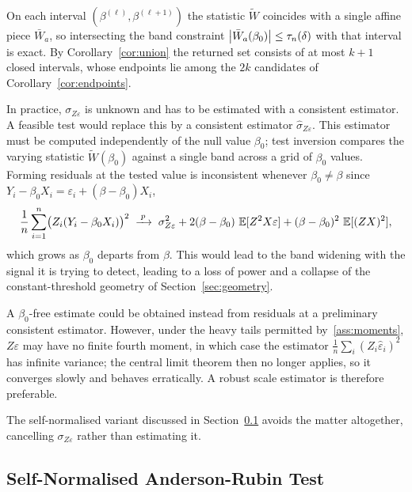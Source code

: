 On each interval $(\beta^{(\ell)},\beta^{(\ell+1)})$ the statistic $\widetilde{W}$ coincides with a single affine piece $\bar{W}_a$, so intersecting the band constraint $\left|\bar{W}_a(\beta_0)\right|\le\tau_n(\delta)$ with that interval is exact. By Corollary~\ref{cor:union} the returned set consists of at most $k+1$ closed intervals, whose endpoints lie among the $2k$ candidates of Corollary~\ref{cor:endpoints}.

\begin{remark}
  In practice, $\sigma_{Z\varepsilon}$ is unknown and has to be estimated with a consistent estimator. A feasible test would replace this by a consistent estimator $\hat{\sigma}_{Z\varepsilon}$. This estimator must be computed independently of the null value $\beta_0$; test inversion compares the varying statistic $\widetilde{W}(\beta_0)$ against a single band across a grid of $\beta_0$ values. Forming residuals at the tested value is inconsistent whenever $\beta_0\neq\beta$ since $Y_i - \beta_0 X_i = \varepsilon_i +
    (\beta-\beta_0)X_i$,
    \[
        \frac{1}{n}\sum_{i=1}^n \bigl(Z_i(Y_i-\beta_0 X_i)\bigr)^2
        \;\xrightarrow{\;p\;}\;
        \sigma_{Z\varepsilon}^2 + 2(\beta-\beta_0)\,\operatorname{\mathbb{E}}[Z^2 X\varepsilon]
        + (\beta-\beta_0)^2\,\operatorname{\mathbb{E}}[(ZX)^2],
    \]
    which grows as $\beta_0$ departs from $\beta$. This would lead to the band widening with the signal it is trying to detect, leading to a loss of power and a collapse of the constant-threshold geometry of Section~\ref{sec:geometry}.
    
    A $\beta_0$-free estimate could be obtained instead from residuals at a preliminary consistent estimator. However, under the heavy tails permitted by~\ref{ass:moments}, $Z\varepsilon$ may have no finite fourth moment, in which case the estimator $\frac1n\sum_i(Z_i\hat{\varepsilon}_i)^2$ has infinite variance; the central limit theorem then no longer applies, so it converges slowly and behaves erratically. A robust scale estimator is therefore preferable.

    The self-normalised variant discussed in Section~\ref{sec:normalisedAR} avoids the matter altogether, cancelling $\sigma_{Z\varepsilon}$ rather than estimating it.
\end{remark}


\subsection{Self-Normalised Anderson-Rubin Test}
\label{sec:normalisedAR}

